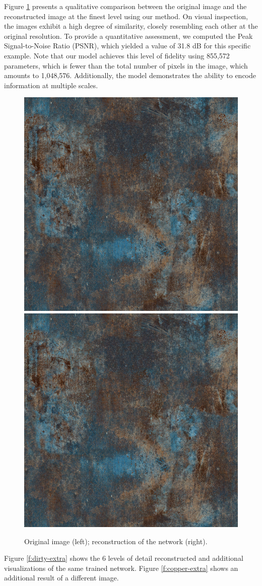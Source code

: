 Figure \ref{f:rec_gt} presents a qualitative comparison between the original image and the reconstructed image at the finest level using our method. On visual inspection, the images exhibit a high degree of similarity, closely resembling each other at the original resolution. To provide a quantitative assessment, we computed the Peak Signal-to-Noise Ratio (PSNR), which yielded a value of 31.8 dB for this specific example. Note that our model achieves this level of fidelity using 855,572 parameters, which is fewer than the total number of pixels in the image, which amounts to 1,048,576. Additionally, the model demonstrates the ability to encode information at multiple scales.

\begin{figure}[h]
\centering
\includegraphics[width=0.42\linewidth]{img/ch6/dirty/gt6.png}
\includegraphics[width=0.42\linewidth]{img/ch6/dirty/detail6.png}
\caption{Original image (left); reconstruction of the network (right).}
\label{f:rec_gt}
\end{figure}

Figure \ref{f:dirty-extra} shows the 6 levels of detail reconstructed and additional visualizations of the same trained network. Figure \ref{f:copper-extra} shows an additional result of a different image.


